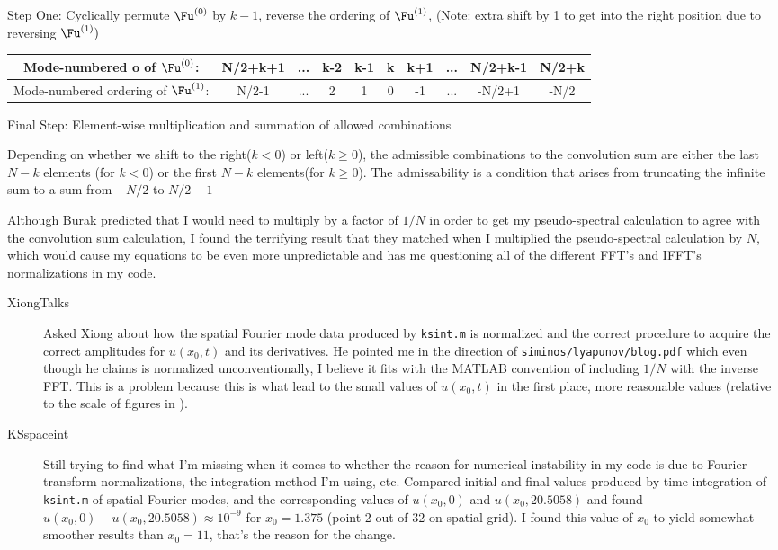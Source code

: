 \begin{description}
{Step One: Cyclically permute $\Fu^{(0)}$ by $k-1$, reverse the ordering of $\Fu^{(1)}$, (Note: extra shift by 1 to get  into the right position due to reversing $\Fu^{(1)})$

\begin{tabular}{c || c | c | c | c | c | c | c | c | c }
\hline
 Mode-numbered o of $\Fu^{(0)}$:
 & N/2+k+1 & ... & k-2 & k-1 & k & k+1 & ... & N/2+k-1  & N/2+k \\ \hline
 Mode-numbered ordering of $\Fu^{(1)}$:
 & N/2-1 & ... & 2 & 1 & 0 & -1 & ... & -N/2+1 & -N/2 \\ \hline
 \end{tabular}

Final Step: Element-wise multiplication and summation of allowed combinations

Depending on whether we shift to the right($k<0$) or left($k\geq0$), the admissible combinations to the convolution sum are either the last $N-k$ elements (for $k<0$) or the first $N-k$ elements(for $k\geq0$). The admissability is a condition that arises from truncating the infinite sum to a sum from $-N/2$ to $N/2-1$


Although Burak predicted that I would need to multiply by a factor of $1/N$ in order to get my pseudo-spectral calculation to agree with the convolution sum calculation, I found the terrifying result that they matched when I multiplied the pseudo-spectral calculation by $N$, which would cause my equations to be even more unpredictable and has me questioning all of the different FFT's and IFFT's normalizations in my code.

\begin{description}
\item[XiongTalks]
Asked Xiong about how the spatial Fourier mode data produced by \texttt{ksint.m} is normalized and the correct procedure to acquire the correct amplitudes for $u(x_0,t)$ and its derivatives. He pointed me in the direction of \texttt{siminos/lyapunov/blog.pdf} which even though he claims is normalized unconventionally, I believe it fits with the MATLAB convention of including $1/N$ with the inverse FFT. This is a problem because this is what lead to the small values of $u(x_0,t)$ in the first place, more reasonable values (relative to the scale of figures in ).

\item[KSspaceint]
Still trying to find what I'm missing when it comes to whether the reason for numerical instability in my code is due to Fourier transform normalizations, the integration method I'm using, etc. Compared initial and final values produced by time integration of \texttt{ksint.m} of spatial Fourier modes, and the corresponding values of $u(x_0,0)$ and $u(x_0,20.5058)$ and found $u(x_0,0) - u(x_0,20.5058) \approx 10^{-9}$ for $x_0 = 1.375$ (point 2 out of 32 on spatial grid). I found this value of $x_0$ to yield somewhat smoother results than $x_0 = 11$, that's the reason for the change.


\end{description}}
\end{description}
